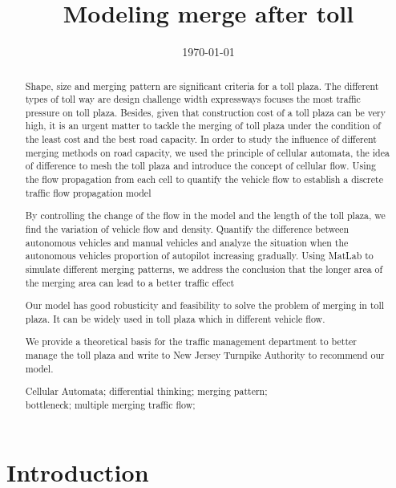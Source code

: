 \documentclass{mcmthesis}
\title{Modeling merge after toll}
\date{\today}
\begin{document}
\begin{abstract}
Shape, size and merging pattern are significant criteria for a toll plaza. The different types of toll way are design challenge width expressways  focuses the most traffic pressure on toll plaza. Besides, given that construction cost of a toll plaza can be very high, it is an urgent matter to tackle the merging of toll plaza under the condition of the least cost and the best road capacity.
In order to study the influence of different merging methods on road capacity, we used the principle of cellular automata, the idea of difference to mesh the toll plaza and introduce the concept of cellular flow. Using the flow propagation from each cell to quantify the vehicle flow to establish a discrete traffic flow propagation model
 
By controlling the change of the flow in the model and the length of the toll plaza, we find the variation of vehicle flow and density. Quantify the difference between autonomous vehicles and manual vehicles and analyze the situation when the autonomous vehicles proportion of autopilot increasing gradually. Using MatLab to simulate different merging patterns, we address the conclusion that the longer area of the merging area can lead to a better traffic effect

Our model has good robusticity and feasibility to solve the problem of merging in toll plaza. It can be widely used in toll plaza which in different vehicle flow. 

We provide a theoretical basis for the traffic management department to better manage the toll plaza and write to New Jersey Turnpike Authority to recommend our model.
\begin{keywords}
Cellular Automata; differential thinking;  merging pattern;\\ bottleneck; multiple merging traffic flow;
\end{keywords}
\end{abstract}
\maketitle
\tableofcontents
\newpage
\section{Introduction}
\end{document}
